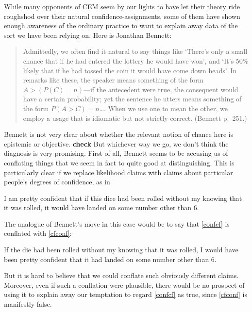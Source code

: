 \documentclass[leqno, 11pt, a5paper, openany]{article}
\newcommand{\page}[1]{p.~#1}
\begin{document}
While many opponents of CEM seem by our lights to have let their theory ride roughshod over their natural confidence-assignments, some of them have shown enough awareness of the ordinary practice to want to explain away data of the sort we have been relying on. Here is Jonathan Bennett:
\begin{quote}
	Admittedly, we often find it natural to say things like `There's only a small chance that if he had entered the lottery he would have won', and `It's 50\% likely that if he had tossed the coin it would have come down heads'. In remarks like these, the speaker means something of the form $A>(P(C)=n)$---if the antecedent were true, the consequent would have a certain probability; yet the sentence he utters means something of the form $P(A>C)=n$\ldots{}. When we use one to mean the other, we employ a usage that is idiomatic but not strictly correct. (Bennett \page{251}.) 
\end{quote}
Bennett is not very clear about whether the relevant notion of chance here is epistemic or objective. \textbf{check} But whichever way we go, we don't think the diagnosis is very promising. First of all, Bennett seems to be accusing us of conflating things that we seem in fact to quite good at distinguishing. This is particularly clear if we replace likelihood claims with claims about particular people's degrees of confidence, as in
\begin{prop}
	\nitem \label{confcf}
	I am pretty confident that if this dice had been rolled without my knowing that it was rolled, it would have landed on some number other than 6.
\end{prop}
The analogue of Bennett's move in this case would be to say that \ref{confcf} is conflated with \ref{cfconf}:
\begin{prop}
	\nitem \label{cfconf}
	If the die had been rolled without my knowing that it was rolled, I
	would have been pretty confident that it had landed on some number
	other than 6.
\end{prop}
But it is hard to believe that we could conflate such obviously different claims. Moreover, even if such a conflation were plausible, there would be no prospect of using it to explain away our temptation to regard \ref{confcf} as true, since \ref{cfconf} is manifestly false.
\end{document}

